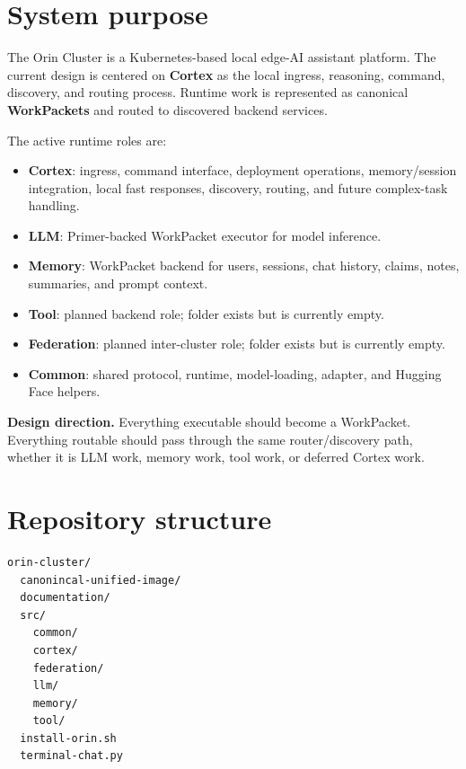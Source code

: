 \documentclass[11pt,a4paper]{article}
\begin{document}
\tableofcontents
\newpage

\section{System purpose}
The Orin Cluster is a Kubernetes-based local edge-AI assistant platform. The current design is centered on \textbf{Cortex} as the local ingress, reasoning, command, discovery, and routing process. Runtime work is represented as canonical \textbf{WorkPackets} and routed to discovered backend services.

The active runtime roles are:
\begin{itemize}[leftmargin=1.2em]
  \item \textbf{Cortex}: ingress, command interface, deployment operations, memory/session integration, local fast responses, discovery, routing, and future complex-task handling.
  \item \textbf{LLM}: Primer-backed WorkPacket executor for model inference.
  \item \textbf{Memory}: WorkPacket backend for users, sessions, chat history, claims, notes, summaries, and prompt context.
  \item \textbf{Tool}: planned backend role; folder exists but is currently empty.
  \item \textbf{Federation}: planned inter-cluster role; folder exists but is currently empty.
  \item \textbf{Common}: shared protocol, runtime, model-loading, adapter, and Hugging Face helpers.
\end{itemize}

\begin{infobox}
\textbf{Design direction.} Everything executable should become a WorkPacket. Everything routable should pass through the same router/discovery path, whether it is LLM work, memory work, tool work, or deferred Cortex work.
\end{infobox}

\section{Repository structure}
\begin{lstlisting}
orin-cluster/
  canonincal-unified-image/
  documentation/
  src/
    common/
    cortex/
    federation/
    llm/
    memory/
    tool/
  install-orin.sh
  terminal-chat.py
\end{lstlisting}
\end{document}
